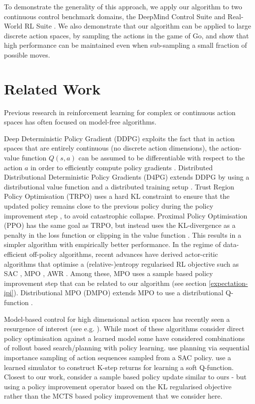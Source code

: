 \documentclass{article}
\newcommand{\dmcs}{DeepMind Control Suite }
\newcommand{\rwrl}{Real-World RL }
\begin{document}
To demonstrate the generality of this approach, we apply our algorithm to two continuous control benchmark domains, the \dmcs \cite{tassa2018deepmind} and \rwrl Suite \cite{dulacarnold2020empirical}. We also demonstrate that our algorithm can be applied to large discrete action spaces, by sampling the actions in the game of Go, and show that high performance can be maintained even when sub-sampling a small fraction of possible moves.


\section{Related Work}

Previous research in reinforcement learning for complex or continuous action spaces has often focused on model-free algorithms.

Deep Deterministic Policy Gradient (DDPG) exploits the fact that in action spaces that are entirely continuous (no discrete action dimensions), the action-value function $Q(s, a)$ can be assumed to be differentiable with respect to the action $a$ in order to efficiently compute policy gradients \cite{ddpg2014silver,lillicrap2015continuous}. Distributed Distributional Deterministic Policy Gradients (D4PG) extends DDPG by using a distributional value function and a distributed training setup \cite{d4pg}.
Trust Region Policy Optimisation (TRPO) uses a hard KL constraint to ensure that the updated policy remains close to the previous policy during the policy improvement step \cite{schulman2015trust}, to avoid catastrophic collapse.
Proximal Policy Optimisation (PPO) has the same goal as TRPO, but instead uses the KL-divergence as a penalty in the loss function or clipping in the value function \cite{schulman2017proximal}. This results in a simpler algorithm with empirically better performance.
In the regime of data-efficient off-policy algorithms, recent advances have derived actor-critic algorithms that optimise a (relative-)entropy regularised RL objective such as SAC \cite{haarnoja2018soft}, MPO \cite{mpo}, AWR \cite{peng2019advantage}. Among these, MPO uses a sample based policy improvement step that can be related to our algorithm (see section \ref{expectation-ipi}). Distributional MPO (DMPO) extends MPO to use a distributional Q-function \cite{hoffman2020acme}.

Model-based control for high dimensional action spaces has recently seen a resurgence of interest (see e.g. \cite{byravan2020imagined,hafner:planet,hafner2019dream, koul2020dream}). While most of these algorithms consider direct policy optimisation against a learned model some have considered combinations of rollout based search/planning with policy learning. \cite{piche2018probabilistic} use planning via sequential importance sampling of action sequences sampled from a SAC policy. \cite{bhardwaj2020information} use a learned simulator to construct K-step returns for learning a soft Q-function. Closest to our work, \cite{springenberg2020local} consider a sample based policy update similar to ours - but using a policy improvement operator based on the KL regularised objective rather than the MCTS based policy improvement that we consider here.
\end{document}
